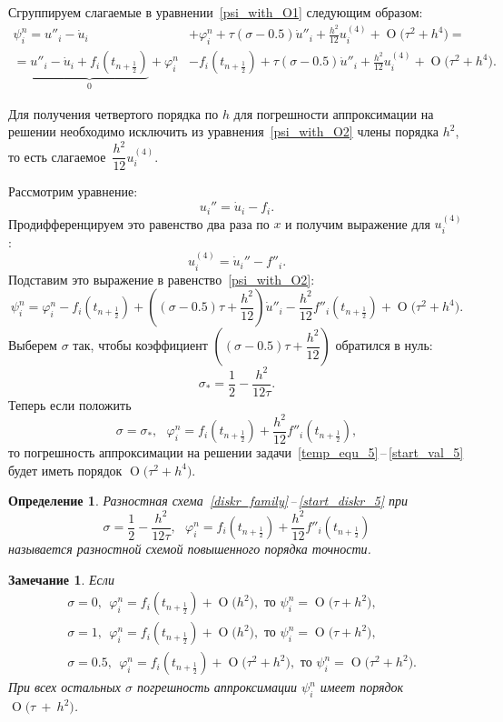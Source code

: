 \documentclass[11pt,a4paper,twoside,listtotoc,bibtotoc]{report}
\numberwithin{equation}{section}
\newtheorem*{definition}{Определение}
\theoremstyle{definition}
\theoremstyle{plain}
\newtheorem*{note*}{Замечание}
\newcommand{\bigO}[1]{\ensuremath{\operatorname{O}\bigl(#1\bigr)}}
\begin{document}
Сгруппируем слагаемые в уравнении~\eqref{psi_with_O1} следующим образом:
%
\begin{equation}
%
    \label{psi_with_O2}
    \begin{split}
        \psi_i^n = u''_i - \dot{u}_i &+ \varphi_i^n + \tau(\sigma - 0.5)\dot{u}''_i
        +\frac{h^2}{12}u^{(4)}_i + \bigO{\tau^2 + h^4} = \\
        = \underbrace{u''_i - \dot{u}_i + f_i(t_{n+\frac12})}_0 + \varphi_i^n &-
        f_i(t_{n+\frac12}) + \tau(\sigma - 0.5)\dot{u}''_i +
        \frac{h^2}{12}u^{(4)}_i + \bigO{\tau^2 + h^4}.
    \end{split}
%
\end{equation}
%

Для получения четвертого порядка по $h$ для погрешности аппроксимации
на решении необходимо
исключить из уравнения~\eqref{psi_with_O2} члены порядка $h^2$, то есть
слагаемое~$\dfrac{h^2}{12}u_i^{(4)}$.

\noindent
Рассмотрим уравнение:
%
$$
    u_i'' = \dot{u}_i - f_i.
$$
%
Продифференцируем это равенство два раза по $x$ и получим выражение для $u_i^{(4)}$:
%
$$
    u_i^{(4)} = \dot{u}_i'' - f''_i.
$$
%
Подставим это выражение в равенство~\eqref{psi_with_O2}:
%
\begin{equation*}
%
    \psi_i^n = \varphi_i^n - f_i(t_{n+\frac12}) +
    \left((\sigma - 0.5)\tau + \frac{h^2}{12}\right) \dot{u}''_i -
    \frac{h^2}{12} f''_i(t_{n+\frac12}) + \bigO{\tau^2 + h^4}.
%
\end{equation*}
%
Выберем $\sigma$ так, чтобы коэффициент $\left((\sigma - 0.5)\tau + \dfrac{h^2}{12}\right)$
обратился в нуль:
%
$$
    \sigma_* = \dfrac12 - \dfrac{h^2}{12\tau}.
$$
%
Теперь если положить
%
$$
    \sigma = \sigma_*,
    ~~~\varphi_i^n = f_i(t_{n+\frac12}) + \frac{h^2}{12} f''_i(t_{n+\frac12}),
$$
%
то погрешность аппроксимации на решении задачи~\eqref{temp_equ_5}\,--\,\eqref{start_val_5}
будет иметь порядок $\bigO{\tau^2 + h^4}$.
%
\begin{definition}
%
    Разностная схема~\eqref{diskr_family}\,--\,\eqref{start_diskr_5} при
    $$
        \sigma = \frac12 - \frac{h^2}{12\tau},
        ~~~\varphi_i^n = f_i(t_{n+\frac12}) + \frac{h^2}{12} f''_i(t_{n+\frac12})
    $$
    называется разностной схемой повышенного порядка точности.
%
\end{definition}
%
\begin{note*}
%
Если
%
$$
    \begin{aligned}
    &\sigma = 0, ~~\varphi_i^n = f_i(t_{n+\frac12}) + \bigO{h^2}, \text{ то } \psi^n_i = \bigO{\tau + h^2}, \\
    &\sigma = 1, ~~\varphi_i^n = f_i(t_{n+\frac12}) + \bigO{h^2}, \text{ то } \psi^n_i = \bigO{\tau + h^2}, \\
    &\sigma = 0.5, ~~\varphi_i^n = f_i(t_{n+\frac12}) + \bigO{\tau^2 + h^2}, \text{ то } \psi^n_i =
    \bigO{\tau^2 + h^2}.
    \end{aligned}
$$
%
    При всех остальных $\sigma$ погрешность аппроксимации $\psi^n_i$ имеет
    порядок $\bigO{\tau~+~h^2}$.
%
\end{note*}
%
\end{document}
